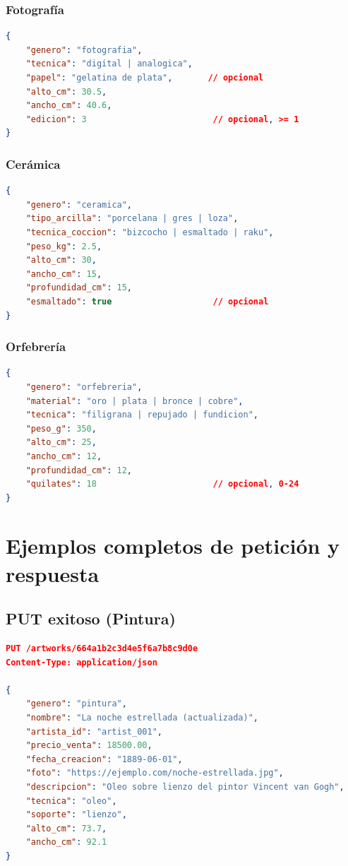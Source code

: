 \documentclass[12pt,a4paper]{article}
\begin{document}
\subsubsection{Fotografía}

\begin{lstlisting}[language=json]
{
    "genero": "fotografia",
    "tecnica": "digital | analogica",
    "papel": "gelatina de plata",       // opcional
    "alto_cm": 30.5,
    "ancho_cm": 40.6,
    "edicion": 3                         // opcional, >= 1
}
\end{lstlisting}

\subsubsection{Cerámica}

\begin{lstlisting}[language=json]
{
    "genero": "ceramica",
    "tipo_arcilla": "porcelana | gres | loza",
    "tecnica_coccion": "bizcocho | esmaltado | raku",
    "peso_kg": 2.5,
    "alto_cm": 30,
    "ancho_cm": 15,
    "profundidad_cm": 15,
    "esmaltado": true                    // opcional
}
\end{lstlisting}

\subsubsection{Orfebrería}

\begin{lstlisting}[language=json]
{
    "genero": "orfebreria",
    "material": "oro | plata | bronce | cobre",
    "tecnica": "filigrana | repujado | fundicion",
    "peso_g": 350,
    "alto_cm": 25,
    "ancho_cm": 12,
    "profundidad_cm": 12,
    "quilates": 18                       // opcional, 0-24
}
\end{lstlisting}

\section{Ejemplos completos de petición y respuesta}

\subsection{PUT exitoso (Pintura)}

\begin{lstlisting}[language=json, caption=Petición]
PUT /artworks/664a1b2c3d4e5f6a7b8c9d0e
Content-Type: application/json

{
    "genero": "pintura",
    "nombre": "La noche estrellada (actualizada)",
    "artista_id": "artist_001",
    "precio_venta": 18500.00,
    "fecha_creacion": "1889-06-01",
    "foto": "https://ejemplo.com/noche-estrellada.jpg",
    "descripcion": "Oleo sobre lienzo del pintor Vincent van Gogh",
    "tecnica": "oleo",
    "soporte": "lienzo",
    "alto_cm": 73.7,
    "ancho_cm": 92.1
}
\end{lstlisting}
\end{document}

